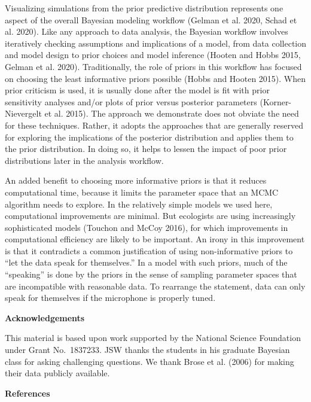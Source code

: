 \documentclass[
  12pt,
]{article}
\begin{document}
Visualizing simulations from the prior predictive distribution
represents one aspect of the overall Bayesian modeling workflow (Gelman
et al. 2020, Schad et al. 2020). Like any approach to data analysis, the
Bayesian workflow involves iteratively checking assumptions and
implications of a model, from data collection and model design to prior
choices and model inference (Hooten and Hobbs 2015, Gelman et al. 2020).
Traditionally, the role of priors in this workflow has focused on
choosing the least informative priors possible (Hobbs and Hooten 2015).
When prior criticism is used, it is usually done after the model is fit
with prior sensitivity analyses and/or plots of prior versus posterior
parameters (Korner-Nievergelt et al. 2015). The approach we demonstrate
does not obviate the need for these techniques. Rather, it adopts the
approaches that are generally reserved for exploring the implications of
the posterior distribution and applies them to the prior distribution.
In doing so, it helps to lessen the impact of poor prior distributions
later in the analysis workflow.

An added benefit to choosing more informative priors is that it reduces
computational time, because it limits the parameter space that an MCMC
algorithm needs to explore. In the relatively simple models we used
here, computational improvements are minimal. But ecologists are using
increasingly sophisticated models (Touchon and McCoy 2016), for which
improvements in computational efficiency are likely to be important. An
irony in this improvement is that it contradicts a common justification
of using non-informative priors to ``let the data speak for
themselves.'' In a model with such priors, much of the ``speaking'' is
done by the priors in the sense of sampling parameter spaces that are
incompatible with reasonable data. To rearrange the statement, data can
only speak for themselves if the microphone is properly tuned.

\textbf{Acknowledgements}

This material is based upon work supported by the National Science
Foundation under Grant No.~1837233. JSW thanks the students in his
graduate Bayesian class for asking challenging questions. We thank Brose
et al. (2006) for making their data publicly available.

\textbf{References}
\end{document}

